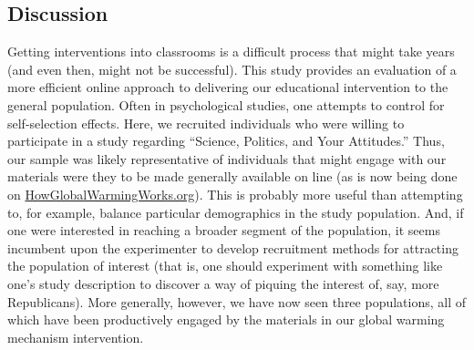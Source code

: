 \subsection{Discussion}

Getting interventions into classrooms is a difficult process that might take
years (and even then, might not be successful). This study provides an
evaluation of a more efficient online approach to delivering our educational
intervention to the general population. Often in psychological studies, one
attempts to control for self-selection effects. Here, we recruited individuals
who were willing to participate in a study regarding “Science, Politics, and
Your Attitudes.” Thus, our sample was likely representative of individuals that
might engage with our materials were they to be made generally available on
line (as is now being done on \url{HowGlobalWarmingWorks.org}). This is probably more useful than attempting to, for example, balance
particular demographics in the study population. And, if one were interested in
reaching a broader segment of the population, it seems incumbent upon the
experimenter to develop recruitment methods for attracting the population of
interest (that is, one should experiment with something like one's study
description to discover a way of piquing the interest of, say, more
Republicans).  More generally, however, we have now seen three populations, all
of which have been productively engaged by the materials in our global warming
mechanism intervention.

